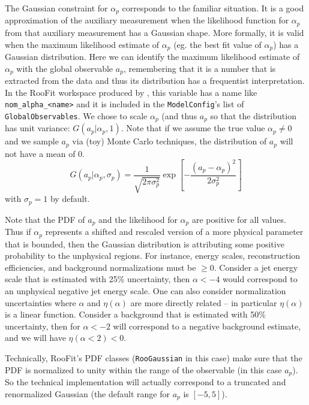 
The Gaussian constraint for $\alpha_p$ corresponds to the familiar situation.  It is a good approximation of the auxiliary measurement when the likelihood function for $\alpha_p$ from that auxiliary measurement has a Gaussian shape.  More formally, it is valid when the maximum likelihood estimate of $\alpha_p$ (eg. the best fit value of $\alpha_p$) has a Gaussian distribution.  Here we can identify the maximum likelihood estimate of $\alpha_p$ with the global observable $a_p$, remembering that it is a number that is extracted from the data and thus its distribution has a frequentist interpretation.  In the RooFit workspace produced by \HF, this variable has a name like \texttt{nom\_alpha\_<name>} and it is included in the \texttt{ModelConfig}'s list of \texttt{GlobalObservables}.  We chose to scale $\alpha_p$ (and thus $a_p$ so that the distribution has unit variance: $G(a_p | \alpha_p,1)$.  Note that if we assume the true value $\alpha_p\ne0$ and we sample $a_p$ via (toy) Monte Carlo techniques, the distribution of $a_p$ will not have a mean of 0.
\begin{equation}
G(a_p | \alpha_p, \sigma_p) = \frac{1}{\sqrt{2\pi \sigma_p^2}} \exp \left[ -\frac{(a_p - \alpha_p)^2}{2\sigma_p^2} \right]
\end{equation}
with $\sigma_p=1$ by default.

Note that the PDF of $a_p$ and the likelihood for $\alpha_p$ are positive for all values.  Thus if $\alpha_p$ represents a shifted and rescaled version of a more physical parameter that is bounded, then the Gaussian distribution is attributing some positive probability to the unphysical regions.  For instance, energy scales, reconstruction efficiencies, and background normalizations must be $\ge 0$. Consider a jet energy scale that is estimated with 25\% uncertainty, then $\alpha<-4$ would correspond to an unphysical negative jet energy scale.  One can also consider normalization uncertainties where $\alpha$ and $\eta(\alpha)$ are more directly related -- in particular $\eta(\alpha)$ is a linear function.  Consider a background that is estimated with 50\% uncertainty, then for $\alpha<-2$ will correspond to a negative background estimate, and we will have $\eta(\alpha<2)<0$.

Technically, RooFit's PDF classes (\texttt{RooGaussian} in this case) make sure that the PDF is normalized to unity within the range of the observable (in this case $a_p$).  So the technical implementation will actually correspond to a truncated and renormalized Gaussian (the default range for $a_p$ is $[-5,5]$).  


